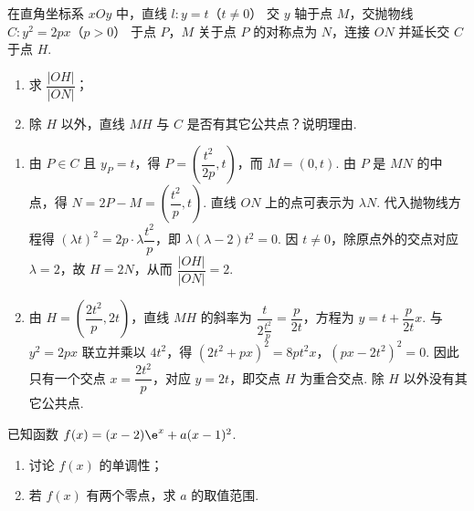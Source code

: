 \begin{problem}
在直角坐标系 \(xOy\) 中，直线 \(l:y=t\)（\(t\ne 0\)） 交 \(y\) 轴于点 \(M\)，交抛物线 \(C:y^2=2px\)（\(p>0\)） 于点 \(P\)，\(M\) 关于点 \(P\) 的对称点为 \(N\)，连接 \(ON\) 并延长交 \(C\) 于点 \(H\).

\begin{enumerate}
\item 求 \(\dfrac{|OH|}{|ON|}\)；
\item 除 \(H\) 以外，直线 \(MH\) 与 \(C\) 是否有其它公共点？说明理由.
\end{enumerate}
\end{problem}

\begin{solution}
\begin{enumerate}
\item 由 \(P\in C\) 且 \(y_P=t\)，得 \(P=\left(\dfrac{t^2}{2p},t\right)\)，而 \(M=(0,t)\). 由 \(P\) 是 \(MN\) 的中点，得 \(N=2P-M=\left(\dfrac{t^2}{p},t\right)\). 直线 \(ON\) 上的点可表示为 \(\lambda N\). 代入抛物线方程得 \((\lambda t)^2=2p\cdot\lambda\dfrac{t^2}{p}\)，即 \(\lambda(\lambda-2)t^2=0\). 因 \(t\ne0\)，除原点外的交点对应 \(\lambda=2\)，故 \(H=2N\)，从而 \(\dfrac{|OH|}{|ON|}=2\).
\item 由 \(H=\left(\dfrac{2t^2}{p},2t\right)\)，直线 \(MH\) 的斜率为 \(\dfrac{t}{2\frac{t^2}{p}}=\dfrac{p}{2t}\)，方程为 \(y=t+\dfrac{p}{2t}x\). 与 \(y^2=2px\) 联立并乘以 \(4t^2\)，得
\(\left(2t^2+px\right)^2=8pt^2x\)，\((px-2t^2)^2=0\).
因此只有一个交点 \(x=\dfrac{2t^2}{p}\)，对应 \(y=2t\)，即交点 \(H\) 为重合交点. 除 \(H\) 以外没有其它公共点.
\end{enumerate}
\end{solution}

\begin{problem}
已知函数 \(f(x)=(x-2)\e^x+a(x-1)^2\).

\begin{enumerate}
\item 讨论 \(f(x)\) 的单调性；
\item 若 \(f(x)\) 有两个零点，求 \(a\) 的取值范围.
\end{enumerate}
\end{problem}

